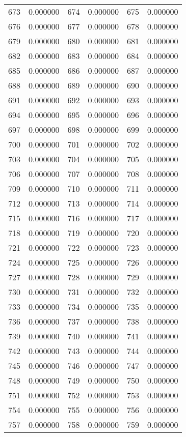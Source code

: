 \documentclass[12pt]{article}
\begin{document}
\begin{longtable}{@{}cc|cc|cc@{}}
673 & 0.000000 & 674 & 0.000000 & 675 & 0.000000 \\
676 & 0.000000 & 677 & 0.000000 & 678 & 0.000000 \\
679 & 0.000000 & 680 & 0.000000 & 681 & 0.000000 \\
682 & 0.000000 & 683 & 0.000000 & 684 & 0.000000 \\
685 & 0.000000 & 686 & 0.000000 & 687 & 0.000000 \\
688 & 0.000000 & 689 & 0.000000 & 690 & 0.000000 \\
691 & 0.000000 & 692 & 0.000000 & 693 & 0.000000 \\
694 & 0.000000 & 695 & 0.000000 & 696 & 0.000000 \\
697 & 0.000000 & 698 & 0.000000 & 699 & 0.000000 \\
700 & 0.000000 & 701 & 0.000000 & 702 & 0.000000 \\
703 & 0.000000 & 704 & 0.000000 & 705 & 0.000000 \\
706 & 0.000000 & 707 & 0.000000 & 708 & 0.000000 \\
709 & 0.000000 & 710 & 0.000000 & 711 & 0.000000 \\
712 & 0.000000 & 713 & 0.000000 & 714 & 0.000000 \\
715 & 0.000000 & 716 & 0.000000 & 717 & 0.000000 \\
718 & 0.000000 & 719 & 0.000000 & 720 & 0.000000 \\
721 & 0.000000 & 722 & 0.000000 & 723 & 0.000000 \\
724 & 0.000000 & 725 & 0.000000 & 726 & 0.000000 \\
727 & 0.000000 & 728 & 0.000000 & 729 & 0.000000 \\
730 & 0.000000 & 731 & 0.000000 & 732 & 0.000000 \\
733 & 0.000000 & 734 & 0.000000 & 735 & 0.000000 \\
736 & 0.000000 & 737 & 0.000000 & 738 & 0.000000 \\
739 & 0.000000 & 740 & 0.000000 & 741 & 0.000000 \\
742 & 0.000000 & 743 & 0.000000 & 744 & 0.000000 \\
745 & 0.000000 & 746 & 0.000000 & 747 & 0.000000 \\
748 & 0.000000 & 749 & 0.000000 & 750 & 0.000000 \\
751 & 0.000000 & 752 & 0.000000 & 753 & 0.000000 \\
754 & 0.000000 & 755 & 0.000000 & 756 & 0.000000 \\
757 & 0.000000 & 758 & 0.000000 & 759 & 0.000000 \\

\end{longtable}
\end{document}
